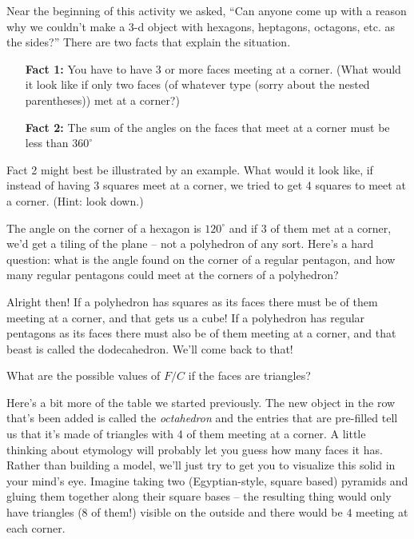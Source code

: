 \wbvfill

\wbnewpage

Near the beginning of this activity we asked, ``Can anyone come up with a reason why we couldn't make a 3-d object with hexagons, heptagons, octagons, etc. as the sides?''  There are two facts that explain the situation.

\begin{itemize}
    \item[{\bf Fact 1:}] You have to have 3 or more faces meeting at a corner. \newline
    (What would it look like if only two faces (of whatever type (sorry about the nested parentheses)) met at a corner?)
    \item[{\bf Fact 2:}] The sum of the angles on the faces that meet at a corner must be less than $360^\circ$ \newline
\end{itemize}

Fact 2 might best be illustrated by an example.  What would it look like, if instead of having 3 squares meet at a corner, we tried to get 4 squares to meet at a corner. (Hint: look down.)

The angle on the corner of a hexagon is $120^\circ$ and if $3$ of them met at a corner, we'd get a tiling of the plane -- not a polyhedron of any sort.  Here's a hard question: what is the angle found on the corner of a regular pentagon, and how many regular pentagons could meet at the corners of a polyhedron?

\vspace{1in}

Alright then! If a polyhedron has squares as its faces there must be \underline{\hstrut} of them meeting at a corner, and that gets us a cube!  If a polyhedron has regular pentagons as its faces there must also be \underline{\hstrut} of them meeting at a corner, and that beast is called the dodecahedron.  We'll come back to that!

What are the possible values of $F/C$ if the faces are triangles?

\vspace{.5in} 

\wbnewpage

Here's a bit more of the table we started previously. The new object in the row that's been added is called the {\em octahedron} and the entries that are pre-filled tell us that it's made of triangles with 4 of them meeting at a corner. A little thinking about etymology will probably let you guess how many faces it has.  Rather than building a model, we'll just try to get you to visualize this solid in your mind's eye.  Imagine taking two (Egyptian-style, square based) pyramids and gluing them together along their square bases -- the resulting thing would only have triangles (8 of them!) visible on the outside and there would be $4$ meeting at each corner.

